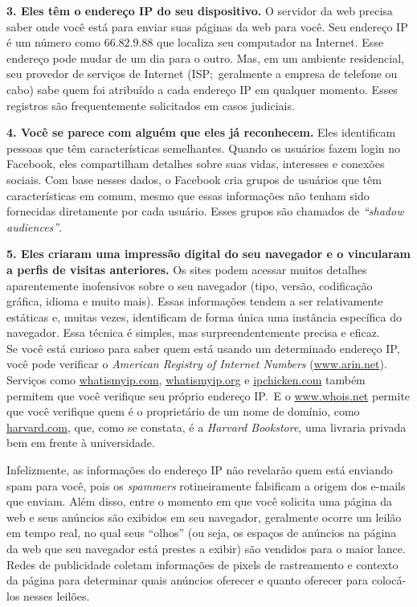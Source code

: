 \documentclass{book}
\newcommand{\ingles}[1]{\textit{#1}}
\begin{document}
\textbf{3. Eles têm o endereço IP do seu dispositivo.} O servidor da web precisa
saber onde você está para enviar suas páginas da web para você. Seu endereço IP
é um número como 66.82.9.88 que localiza seu computador na Internet. Esse
endereço pode mudar de um dia para o outro. Mas, em um ambiente residencial, seu
provedor de serviços de Internet (ISP;~geralmente a empresa de telefone ou cabo)
sabe quem foi atribuído a cada endereço IP em qualquer momento. Esses registros
são frequentemente solicitados em casos judiciais.

\textbf{4. Você se parece com alguém que eles já reconhecem.} Eles identificam
pessoas que têm características semelhantes. Quando os usuários fazem login no
Facebook, eles compartilham detalhes sobre suas vidas, interesses e conexões
sociais. Com base nesses dados, o Facebook cria grupos de usuários que têm
características em comum, mesmo que essas informações não tenham sido fornecidas
diretamente por cada usuário. Esses grupos são chamados de \ingles{``shadow audiences''}.

\textbf{5. Eles criaram uma impressão digital do seu navegador e o vincularam a
perfis de visitas anteriores.} Os sites podem acessar muitos detalhes aparentemente
inofensivos sobre o seu navegador (tipo, versão, codificação gráfica, idioma e
muito mais). Essas informações tendem a ser relativamente estáticas e, muitas
vezes, identificam de forma única uma instância específica do navegador.
Essa técnica é simples, mas surpreendentemente precisa e eficaz.\\

Se você está curioso para saber quem está usando um determinado endereço IP,
você pode verificar o \ingles{American Registry of Internet Numbers}
(\url{www.arin.net}). Serviços como \url{whatismyip.com}, \url{whatismyip.org}
e \url{ipchicken.com} também permitem que você verifique seu próprio endereço
IP.~E o \url{www.whois.net} permite que você verifique quem é o proprietário de
um nome de domínio, como \url{harvard.com}, que, como se constata, é a
\ingles{Harvard Bookstore}, uma livraria privada bem em frente à universidade.

Infelizmente, as informações do endereço IP não revelarão quem está enviando
spam para você, pois os \ingles{spammers} rotineiramente falsificam a origem
dos e-mails que enviam. Além disso, entre o momento em que você solicita uma
página da web e seus anúncios são exibidos em seu navegador, geralmente ocorre
um leilão em tempo real, no qual seus ``olhos'' (ou seja, os espaços de
anúncios na página da web que seu navegador está prestes a exibir) são vendidos
para o maior lance. Redes de publicidade coletam informações de pixels de
rastreamento e contexto da página para determinar quais anúncios oferecer e
quanto oferecer para colocá-los nesses leilões.
\end{document}
